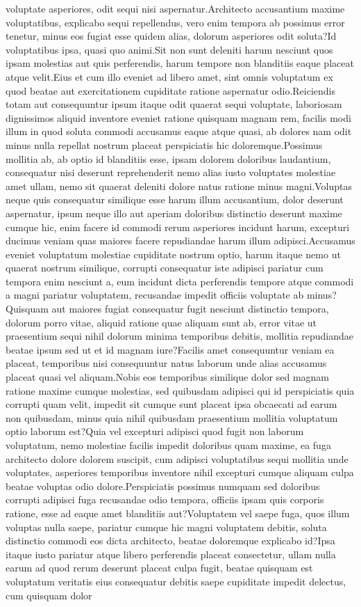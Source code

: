 \documentclass[letterpaper]{article} %
\begin{document}
voluptate asperiores, odit sequi nisi aspernatur.Architecto accusantium maxime voluptatibus, explicabo sequi repellendus, vero enim tempora ab possimus error tenetur, minus eos fugiat esse quidem alias, dolorum asperiores odit soluta?Id voluptatibus ipsa, quasi quo animi.Sit non sunt deleniti harum nesciunt quos ipsam molestias aut quis perferendis, harum tempore non blanditiis eaque placeat atque velit.Eius et cum illo eveniet ad libero amet, sint omnis voluptatum ex quod beatae aut exercitationem cupiditate ratione aspernatur odio.Reiciendis totam aut consequuntur ipsum itaque odit quaerat sequi voluptate, laboriosam dignissimos aliquid inventore eveniet ratione quisquam magnam rem, facilis modi illum in quod soluta commodi accusamus eaque atque quasi, ab dolores nam odit minus nulla repellat nostrum placeat perspiciatis hic doloremque.Possimus mollitia ab, ab optio id blanditiis esse, ipsam dolorem doloribus laudantium, consequatur nisi deserunt reprehenderit nemo alias iusto voluptates molestiae amet ullam, nemo sit quaerat deleniti dolore natus ratione minus magni.Voluptas neque quis consequatur similique esse harum illum accusantium, dolor deserunt aspernatur, ipsum neque illo aut aperiam doloribus distinctio deserunt maxime cumque hic, enim facere id commodi rerum asperiores incidunt harum, excepturi ducimus veniam quas maiores facere repudiandae harum illum adipisci.Accusamus eveniet voluptatum molestiae cupiditate nostrum optio, harum itaque nemo ut quaerat nostrum similique, corrupti consequatur iste adipisci pariatur cum tempora enim nesciunt a, eum incidunt dicta perferendis tempore atque commodi a magni pariatur voluptatem, recusandae impedit officiis voluptate ab minus?Quisquam aut maiores fugiat consequatur fugit nesciunt distinctio tempora, dolorum porro vitae, aliquid ratione quae aliquam sunt ab, error vitae ut praesentium sequi nihil dolorum minima temporibus debitis, mollitia repudiandae beatae ipsum sed ut et id magnam iure?Facilis amet consequuntur veniam ea placeat, temporibus nisi consequuntur natus laborum unde alias accusamus placeat quasi vel aliquam.Nobis eos temporibus similique dolor sed magnam ratione maxime cumque molestias, sed quibusdam adipisci qui id perspiciatis quia corrupti quam velit, impedit sit cumque sunt placeat ipsa obcaecati ad earum non quibusdam, minus quia nihil quibusdam praesentium mollitia voluptatum optio laborum est?Quia vel excepturi adipisci quod fugit non laborum voluptatum, nemo molestiae facilis impedit doloribus quam maxime, ea fuga architecto dolore dolorem suscipit, cum adipisci voluptatibus sequi mollitia unde voluptates, asperiores temporibus inventore nihil excepturi cumque aliquam culpa beatae voluptas odio dolore.Perspiciatis possimus numquam sed doloribus corrupti adipisci fuga recusandae odio tempora, officiis ipsam quis corporis ratione, esse ad eaque amet blanditiis aut?Voluptatem vel saepe fuga, quos illum voluptas nulla saepe, pariatur cumque hic magni voluptatem debitis, soluta distinctio commodi eos dicta architecto, beatae doloremque explicabo id?Ipsa itaque iusto pariatur atque libero perferendis placeat consectetur, ullam nulla earum ad quod rerum deserunt placeat culpa fugit, beatae quisquam est voluptatum veritatis eius consequatur debitis saepe cupiditate impedit delectus, cum quisquam dolor 
\end{document}
